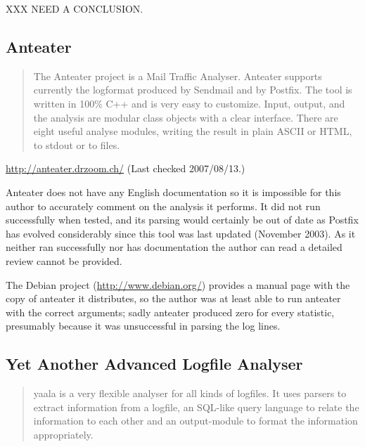 XXX NEED A CONCLUSION\@.

\subsection{Anteater}

\begin{quotation}

    The Anteater project is a Mail Traffic Analyser. Anteater supports
    currently the logformat produced by Sendmail and by Postfix. The tool
    is written in 100\% C++ and is very easy to customize. Input, output,
    and the analysis are modular class objects with a clear interface.
    There are eight useful analyse modules, writing the result in plain
    ASCII or HTML, to stdout or to files.

\end{quotation}

\noindent{}\url{http://anteater.drzoom.ch/} \newline{}
(Last checked 2007/08/13.)

Anteater does not have any English documentation so it is impossible for
this author to accurately comment on the analysis it performs.  It did not
run successfully when tested, and its parsing would certainly be out of
date as Postfix has evolved considerably since this tool was last updated
(November 2003).  As it neither ran successfully nor has documentation the
author can read a detailed review cannot be provided.

The Debian project (\url{http://www.debian.org/}) provides a manual page
with the copy of anteater it distributes, so the author was at least able
to run anteater with the correct arguments; sadly anteater produced zero
for every statistic, presumably because it was unsuccessful in parsing the
log lines.

\subsection{Yet Another Advanced Logfile Analyser}

\begin{quotation}

    yaala is a very flexible analyser for all kinds of logfiles. It uses
    parsers to extract information from a logfile, an SQL-like query
    language to relate the information to each other and an output-module
    to format the information appropriately.

\end{quotation}

